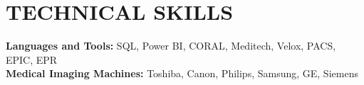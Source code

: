 
\section{\textcolor{airforceblue}{TECHNICAL SKILLS}}
 \begin{itemize}[leftmargin=0in, label={}]
    \small{\item{
     \textbf{Languages and Tools:}{ SQL, Power BI, CORAL, Meditech, Velox, PACS, EPIC, EPR} \\
      \vspace{1.2pt}
     \textbf{Medical Imaging Machines:}{ Toshiba, Canon, Philips, Samsung, GE, Siemens} \\
      \vspace{1.2pt}
     }}
 \end{itemize}
 \vspace{-10pt}
